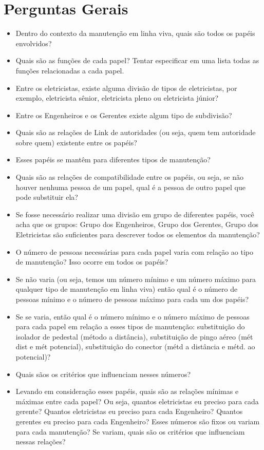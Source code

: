 \section{Perguntas Gerais}
\begin{itemize}
    \item Dentro do contexto da manutenção em linha viva, quais são todos os papéis envolvidos?
    \item Quais são as funções de cada papel? Tentar especificar em uma lista todas as funções relacionadas a cada papel.
    \item Entre os eletricistas, existe alguma divisão de tipos de eletricistas, por exemplo, eletricista sênior, eletricista pleno ou eletricista júnior?
    \item Entre os Engenheiros e os Gerentes existe algum tipo de subdivisão?
    \item Quais são as relações de Link de autoridades (ou seja, quem tem autoridade sobre quem) existente entre os papéis?
    \item Esses papéis se mantêm para diferentes tipos de manutenção?
    \item Quais são as relações de compatibilidade entre os papéis, ou seja, se não houver nenhuma pessoa de um papel, qual é a pessoa de outro papel que pode substituir ela?
    \item Se fosse necessário realizar uma divisão em grupo de diferentes papéis, você acha que os grupos: Grupo dos Engenheiros, Grupo dos Gerentes, Grupo dos Eletricistas são suficientes para descrever todos os elementos da manutenção?
    \item O número de pessoas necessárias para cada papel varia com relação ao tipo de manutenção? Isso ocorre em todos os papéis?
    \item Se não varia (ou seja, temos um número mínimo e um número máximo para qualquer tipo de manutenção em linha viva) então qual é o número de pessoas mínimo e o número de pessoas máximo para cada um dos papéis?
    \item Se se varia, então qual é o número mínimo e o número máximo de pessoas para cada papel em relação a esses tipos de manutenção: substituição do isolador de pedestal (método a distância), substituição de pingo aéreo (mét dist e mét potencial), substituição do conector (métd a distância e métd. ao potencial)?
    \item Quais sãos os critérios que influenciam nesses números?
    \item Levando em consideração esses papéis, quais são as relações mínimas e máximas entre cada papel? Ou seja, quantos eletricistas eu preciso para cada gerente? Quantos eletricistas eu preciso para cada Engenheiro? Quantos gerentes eu preciso para cada Engenheiro? Esses números são fixos ou variam para cada manutenção? Se variam, quais são os critérios que influenciam nessas relações?

\end{itemize}
